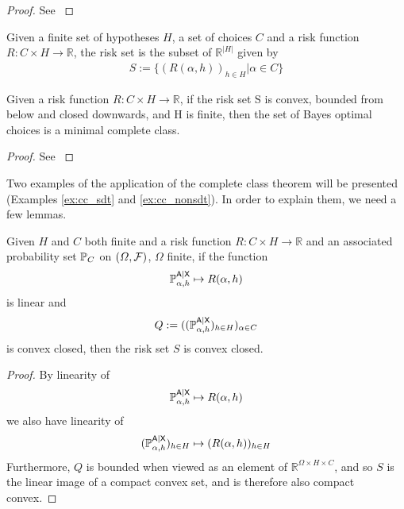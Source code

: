 \begin{proof}
See \citet[Theorem 2.1]{toutenburg_ferguson_1967}
\end{proof}

\begin{definition}
Given a finite set of hypotheses $H$, a set of choices $C$ and a risk function $R:C\times H\to \mathbb{R}$, the risk set is the subset of $\mathbb{R}^{|H|}$ given by
\begin{align}
    S := \{(R(\alpha,h))_{h\in H}|\alpha\in C\}
\end{align}
\end{definition}

\begin{theorem}
Given a risk function $R:C\times H\to \mathbb{R}$, if the risk set S is convex, bounded from below and closed downwards, and H is finite, then the set of Bayes optimal choices is a minimal complete class.
\end{theorem}

\begin{proof}
See \citet[~Theorem 2.10.2]{toutenburg_ferguson_1967}
\end{proof}

Two examples of the application of the complete class theorem will be presented (Examples \ref{ex:cc_sdt} and \ref{ex:cc_nonsdt}). In order to explain them, we need a few lemmas.

\begin{lemma}\label{lem:convex_closed}
Given $H$ and $C$ both finite and a risk function $R:C\times H\to \mathbb{R}$ and an associated probability set $\mathbb{P}_C$ on $(\Omega,\mathcal{F})$, $\Omega$ finite, if the function
\begin{align}
    \mathbb{P}_{\alpha,h}^{\mathsf{A}|\mathsf{X}}\mapsto R(\alpha,h)
\end{align}
is linear and 
\begin{align}
    Q:= ((\mathbb{P}_{\alpha,h}^{\mathsf{A}|\mathsf{X}})_{h\in H})_{\alpha\in C}
\end{align}
is convex closed, then the risk set $S$ is convex closed.
\end{lemma}

\begin{proof}
By linearity of 
\begin{align}
    \mathbb{P}_{\alpha,h}^{\mathsf{A}|\mathsf{X}}\mapsto R(\alpha,h)
\end{align}
we also have linearity of 
\begin{align}
    (\mathbb{P}_{\alpha,h}^{\mathsf{A}|\mathsf{X}})_{h\in H}\mapsto (R(\alpha,h))_{h\in H}
\end{align}
Furthermore, $Q$ is bounded when viewed as an element of $\mathbb{R}^{\Omega\times H\times C}$, and so $S$ is the linear image of a compact convex set, and is therefore also compact convex.
\end{proof}

